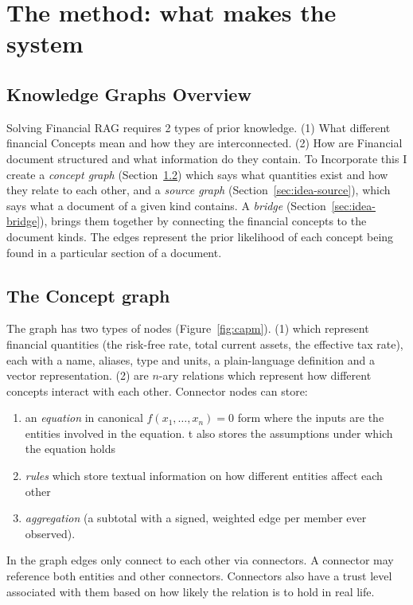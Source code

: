 \section{The method: what makes the system}
\label{sec:idea}

\subsection{Knowledge Graphs Overview}
\label{sec:idea-pivot}



\label{sec:idea-three}
Solving Financial RAG requires 2 types of prior knowledge. (1) What different financial Concepts mean and how they are interconnected. (2) How are Financial document structured and what information do they contain. To Incorporate this I create a \emph{concept graph} (Section~\ref{sec:idea-graph}) which says what quantities exist and how they relate to each other, and a \emph{source graph} (Section~\ref{sec:idea-source}), which says what a document of a given kind contains. A \emph{bridge} (Section~\ref{sec:idea-bridge}),  brings them together by connecting the financial concepts to the document kinds. The edges represent the prior likelihood of each concept being found in a particular section of a document.



\subsection{The Concept graph}
\label{sec:idea-graph}

The graph has two types of nodes (Figure~\ref{fig:capm}). (1)  which represent financial quantities (the risk-free rate, total current assets, the effective tax rate), each with a name, aliases, type and units, a plain-language definition and a vector representation. (2)  are \(n\)-ary relations which represent how different concepts interact with each other. Connector nodes can store:
\begin{enumerate}
    \item an \emph{equation} in canonical \(f(x_1,\dots,x_n)=0\) form where the inputs are the entities involved in the equation. t also stores the assumptions under which the equation holds
    \item \emph{rules} which store textual information on how different entities affect each other
    \item \emph{aggregation} (a subtotal with a signed, weighted edge per member ever observed).
\end{enumerate}
In the graph edges only connect to each other via connectors. A connector may reference both entities and other connectors. Connectors also have a trust level associated with them based on how likely the relation is to hold in real life.

